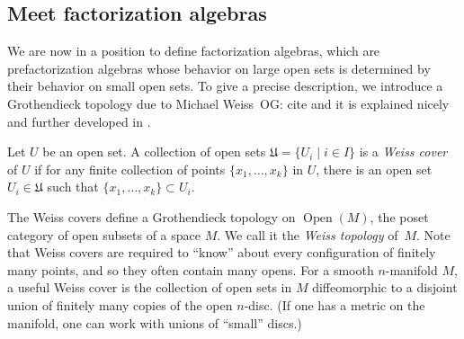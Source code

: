 \documentclass[11pt]{amsart}
\def\Open{\operatorname{Open}}
\def\owen#1{{\textcolor{violet!65!black}{OG: {#1}}}}
\begin{document}
%
%
%

\subsection{Meet factorization algebras}

We are now in a position to define factorization algebras,
which are prefactorization algebras whose behavior on large open sets is determined by their behavior on small open sets.
To give a precise description, we introduce a Grothendieck topology due to Michael Weiss~\owen{cite  \cite{Weiss} and it is explained nicely and further developed in \cite{BoavidaWeiss}}.

\begin{dfn}
Let $U$ be an open set. A collection of open sets $\mathfrak{U} = \{ U_i \mid i \in I\}$ is a {\em Weiss cover} of $U$ if for any finite collection of points $\{x_1,\ldots,x_k\}$ in $U$, there is an open set $U_i \in \mathfrak{U}$ such that $\{x_1,\ldots,x_k\} \subset U_i$.
\end{dfn}

The Weiss covers define a Grothendieck topology on $\Open(M)$, the poset category of open subsets of a space $M$. We call it the {\em Weiss topology} of~$M$. 
Note that Weiss covers are required to ``know'' about every configuration of finitely many points,
and so they often contain many opens.
For a smooth $n$-manifold $M$, a useful Weiss cover is the collection of open sets in $M$ diffeomorphic to a disjoint union of finitely many copies of the open $n$-disc.
(If one has a metric on the manifold, one can work with unions of ``small'' discs.)
\end{document}
